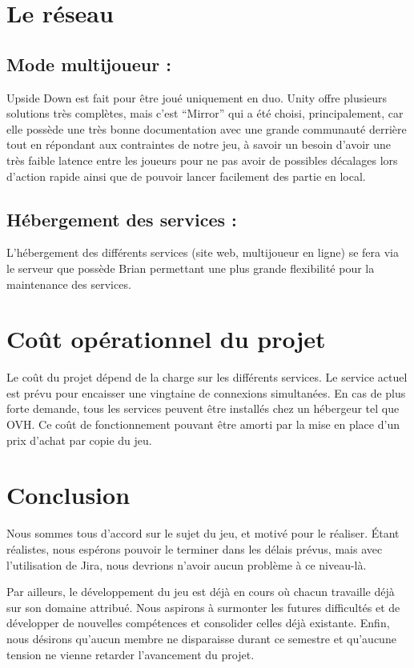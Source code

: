 \documentclass[a4paper,11pt]{article}
\begin{document}
\section{Le réseau}

\subsection{Mode multijoueur :} 
	
Upside Down est fait pour être joué uniquement en duo. Unity offre plusieurs solutions très complètes, 
mais c’est “Mirror” qui a été choisi, principalement, car elle possède une très bonne documentation avec une 
grande communauté derrière tout en répondant aux contraintes de notre jeu, à savoir un besoin d’avoir une 
très faible latence entre les joueurs pour ne pas avoir de possibles décalages lors d’action rapide ainsi 
que de pouvoir lancer facilement des partie en local.


\subsection{Hébergement des services :}
	
L'hébergement des différents services (site web, multijoueur en ligne) se fera via le serveur 
que possède Brian permettant une plus grande flexibilité pour la maintenance des services.



\section{Coût opérationnel du projet}

Le coût du projet dépend de la charge sur les différents services.
Le service actuel est prévu pour encaisser une vingtaine de connexions simultanées.
En cas de plus forte demande, tous les services peuvent être installés chez un hébergeur tel que OVH. 
Ce coût de fonctionnement pouvant être amorti par la mise en place d’un prix d’achat par copie du jeu.


\section{Conclusion}

Nous sommes tous d'accord sur le sujet du jeu, et motivé pour le réaliser. Étant réalistes, nous espérons pouvoir le terminer
dans les délais prévus, mais avec l'utilisation de Jira, nous devrions n'avoir aucun problème à ce niveau-là.

Par ailleurs, le développement du jeu est déjà en cours où chacun travaille déjà sur son domaine attribué. Nous aspirons à surmonter les futures difficultés et de développer de nouvelles compétences et consolider celles déjà existante.
Enfin, nous désirons qu'aucun membre ne disparaisse durant ce semestre et qu'aucune tension ne vienne retarder l'avancement du projet.
\end{document}
